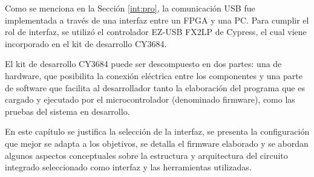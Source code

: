 Como se menciona en la Sección \ref{int:pro}, la comunicación USB fue implementada a través de una interfaz entre un FPGA y una PC. Para cumplir el rol de interfaz, se utilizó el controlador EZ-USB FX2LP de Cypress, el cual viene incorporado en el kit de desarrollo CY3684.

El kit de desarrollo CY3684 puede ser descompuesto en dos partes: una de hardware, que posibilita la conexión eléctrica entre los componentes y una parte de software que facilita al desarrollador tanto la elaboración del programa que es cargado y ejecutado por el microcontrolador (denominado firmware), como las pruebas del sistema en desarrollo.

En este capítulo se justifica la selección de la interfaz, se presenta la configuración que mejor se adapta a los objetivos, se detalla el firmware elaborado y se abordan algunos aspectos conceptuales sobre la estructura y arquitectura del circuito integrado seleccionado como interfaz y las herramientas utilizadas.%



